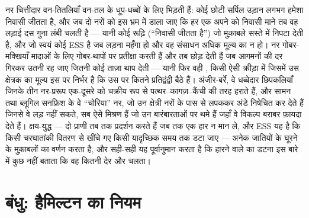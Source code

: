 \begin{example}[क्षेत्र में क्रीड़ाएँ]\label{ex:b3:behavioural-ecology:games}
नर चित्तीदार वन-तितलियाँ वन-तल के धूप-धब्बों के लिए भिड़ती हैं: कोई
छोटी सर्पिल उड़ान लगभग हमेशा निवासी जीतता है, और जब दो नरों को इस
भ्रम में डाला जाए कि हर एक अपने को निवासी माने तब वह लड़ाई दस गुना लंबी
चलती है --- यानी कोई रूढ़ि (``निवासी जीतता है'') जो मुक़ाबले सस्ते में
निपटा देती है, और जो स्वयं कोई ESS है जब लड़ना महँगा हो और वह संसाधन
अधिक मूल्य का न हो। नर गोबर-मक्खियाँ मादाओं के लिए गोबर-थापों पर
प्रतीक्षा करती हैं और तब छोड़ देती हैं जब आगमनों की दर गिरकर उतनी रह
जाए जितनी कोई ताज़ा थाप देती --- यानी फिर वही , किसी
ऐसी क्रीड़ा में जिसमें उस क्षेत्रक का मूल्य इस पर निर्भर है कि उस पर
कितने प्रतिद्वंद्वी बैठे हैं। अंजीर-बर्रे, वे धब्बेदार छिपकलियाँ जिनके
तीन नर-प्ररूप एक-दूसरे को चक्रीय रूप से पत्थर--कागज़--कैंची की तरह
हराते हैं, और सामन तथा ब्लूगिल सनफ़िश के वे ``चोरिया'' नर, जो उन क्षेत्री
नरों के पास से लपककर अंडे निषेचित कर देते हैं जिनसे वे लड़ नहीं सकते,
सब ऐसे मिश्रण हैं जो उन बारंबारताओं पर थमे हैं जहाँ वे विकल्प बराबर
फ़ायदा देते हैं। क्षय-युद्ध --- दो प्राणी तब तक प्रदर्शन करते हैं जब तक
एक हार न मान ले, और ESS यह है कि किसी चरघातांकी वितरण से खींचे गए किसी
यादृच्छिक समय तक डटा जाए --- अनेक जातियों के घूरने के मुक़ाबलों का वर्णन
करता है, और सही-सही यह पूर्वानुमान करता है कि हारने वाले का डटना इस
बारे में कुछ नहीं बताता कि वह कितनी देर और चलता।
\end{example}

\section{बंधु: हैमिल्टन का नियम}

